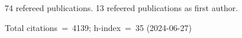 74 refereed publications. 13 refeered publications as first author.

Total citations~=~4139; h-index~=~35 (2024-06-27)